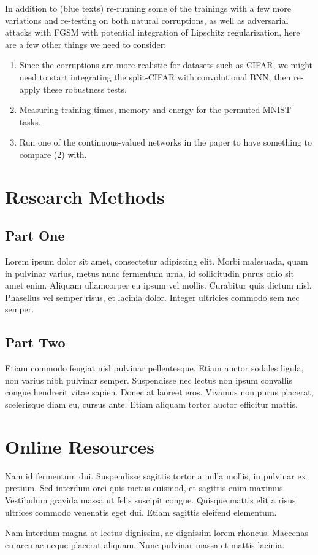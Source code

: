 \documentclass[manuscript,screen,review]{acmart}
\begin{document}
In addition to (blue texts) re-running some of the trainings with a few more variations and re-testing on both natural corruptions, as well as adversarial attacks with FGSM with potential integration of Lipschitz regularization, here are a few other things we need to consider:
\begin{enumerate}
    \item Since the corruptions are more realistic for datasets such as CIFAR, we might need to start integrating the split-CIFAR with convolutional BNN, then re-apply these robustness tests.
    \item Measuring training times, memory and energy for the permuted MNIST tasks.
    \item Run one of the continuous-valued networks in the paper to have something to compare (2) with.
\end{enumerate}








\appendix

\section{Research Methods}

\subsection{Part One}

Lorem ipsum dolor sit amet, consectetur adipiscing elit. Morbi
malesuada, quam in pulvinar varius, metus nunc fermentum urna, id
sollicitudin purus odio sit amet enim. Aliquam ullamcorper eu ipsum
vel mollis. Curabitur quis dictum nisl. Phasellus vel semper risus, et
lacinia dolor. Integer ultricies commodo sem nec semper.

\subsection{Part Two}

Etiam commodo feugiat nisl pulvinar pellentesque. Etiam auctor sodales
ligula, non varius nibh pulvinar semper. Suspendisse nec lectus non
ipsum convallis congue hendrerit vitae sapien. Donec at laoreet
eros. Vivamus non purus placerat, scelerisque diam eu, cursus
ante. Etiam aliquam tortor auctor efficitur mattis.

\section{Online Resources}

Nam id fermentum dui. Suspendisse sagittis tortor a nulla mollis, in
pulvinar ex pretium. Sed interdum orci quis metus euismod, et sagittis
enim maximus. Vestibulum gravida massa ut felis suscipit
congue. Quisque mattis elit a risus ultrices commodo venenatis eget
dui. Etiam sagittis eleifend elementum.

Nam interdum magna at lectus dignissim, ac dignissim lorem
rhoncus. Maecenas eu arcu ac neque placerat aliquam. Nunc pulvinar
massa et mattis lacinia.
\end{document}
